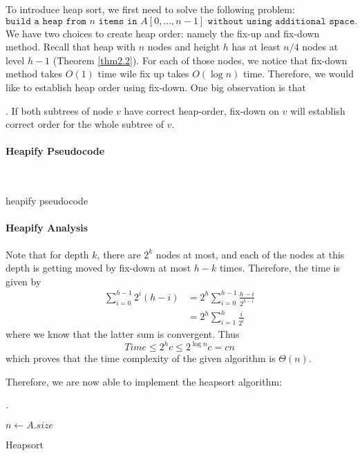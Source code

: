 \documentclass{article}
\begin{document}
To introduce heap sort, we first need to solve the following problem: 
\[ \texttt{build a heap from $n$ items in $A[0, \ldots, n-1]$ without using additional space. } \]
We have two choices to create heap order: namely the fix-up and fix-down method. Recall that heap with $n$ nodes and height $h$ has at least $n/4$ nodes at level $h-1$ (Theorem \ref{thm2.2}). For each of those nodes, we notice that fix-down method takes $O(1)$ time wile fix up takes $O(\log{n})$ time. Therefore, we would like to establish heap order using fix-down. One big observation is that 

\begin{comm}[].
    If both subtrees of node $v$ have correct heap-order, fix-down on $v$ will establish correct order for the whole subtree of $v$. 
\end{comm}

\paragraph{Heapify Pseudocode} \phantom{text} \\ 
\begin{algorithm}[H] 
    \caption{heapify pseudocode}
\end{algorithm}

\paragraph{Heapify Analysis}

Note that for depth $k$, there are $2^k$ nodes at most, and each of the nodes at this depth is getting moved by fix-down at most $h-k$ times. Therefore, the time is given by 
\begin{align*}
    \sum_{i = 0}^{h-1} 2^i (h - i) 
    & = 2^h \sum_{i = 0}^{h-1} \frac{h - i}{2^{h - i}} \\ 
    & = 2^h \sum_{i = 1}^{h} \frac{i}{2^i} 
\end{align*}
where we know that the latter sum is convergent. Thus 
\[ Time \leq 2^h c \leq 2^{\log{n}} c = cn \]
which proves that the time complexity of the given algorithm is $\Theta(n)$. 

Therefore, we are now able to implement the heapsort algorithm: 
\begin{algo}[].
    \begin{algorithm}[H] 
        $n \leftarrow A.size$ \\ 
        \caption{Heapsort}
    \end{algorithm}
\end{algo}
\end{document}
